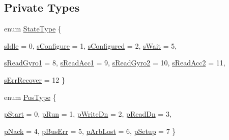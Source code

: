\subsection*{Private Types}
\begin{DoxyCompactItemize}
\item 
enum \hyperlink{class_i_m_u_a7b5e1bf1cf1407b3e4cf0dd2e18b523f}{StateType} \{ \par
\hyperlink{class_i_m_u_a7b5e1bf1cf1407b3e4cf0dd2e18b523fa82181a217d68f26cba06b38cfb94c1bc}{sIdle} =  0, 
\hyperlink{class_i_m_u_a7b5e1bf1cf1407b3e4cf0dd2e18b523fae3a15f0845da0f426c48b6bd9ed01b21}{sConfigure} =  1, 
\hyperlink{class_i_m_u_a7b5e1bf1cf1407b3e4cf0dd2e18b523fa98a87654cac5bbc7d12c9701563dbae5}{sConfigured} =  2, 
\hyperlink{class_i_m_u_a7b5e1bf1cf1407b3e4cf0dd2e18b523fa4d7c7afff1b740c59d740b9b77a8d18c}{sWait} =  5, 
\par
\hyperlink{class_i_m_u_a7b5e1bf1cf1407b3e4cf0dd2e18b523fa8f3b3efb815c4ee9396ccb1fda939f77}{sReadGyro1} =  8, 
\hyperlink{class_i_m_u_a7b5e1bf1cf1407b3e4cf0dd2e18b523fa7e6ba39651fb8aca4abcdf80ed789d8b}{sReadAcc1} =  9, 
\hyperlink{class_i_m_u_a7b5e1bf1cf1407b3e4cf0dd2e18b523fa2e538ebe471a9482d15ab162ec3bdc6d}{sReadGyro2} =  10, 
\hyperlink{class_i_m_u_a7b5e1bf1cf1407b3e4cf0dd2e18b523fa4d82e2432f2e2075cef6143740c4df59}{sReadAcc2} =  11, 
\par
\hyperlink{class_i_m_u_a7b5e1bf1cf1407b3e4cf0dd2e18b523fae27080f67607320b8cc57d8402a07277}{sErrRecover} =  12
 \}
\item 
enum \hyperlink{class_i_m_u_ad01128d82debc1e4213affe4858f3144}{PosType} \{ \par
\hyperlink{class_i_m_u_ad01128d82debc1e4213affe4858f3144a1d2d6c166c92bec6d19b37a6dbeeaf8c}{pStart} =  0, 
\hyperlink{class_i_m_u_ad01128d82debc1e4213affe4858f3144a9cb1b471b394a5a3a87c6bab61ae00e4}{pRun} =  1, 
\hyperlink{class_i_m_u_ad01128d82debc1e4213affe4858f3144ac2332a4383aa00818b3fc4ed83ec1f4d}{pWriteDn} =  2, 
\hyperlink{class_i_m_u_ad01128d82debc1e4213affe4858f3144a1b257baca1eb9eb3e7192a01770cce76}{pReadDn} =  3, 
\par
\hyperlink{class_i_m_u_ad01128d82debc1e4213affe4858f3144ac361e1f3b3b93592825ae06da0309c62}{pNack} =  4, 
\hyperlink{class_i_m_u_ad01128d82debc1e4213affe4858f3144a3db70da4b0066e7738bed5e25f4fc405}{pBusErr} =  5, 
\hyperlink{class_i_m_u_ad01128d82debc1e4213affe4858f3144a5b061676aa01e1049ff07e5a191c9af8}{pArbLost} =  6, 
\hyperlink{class_i_m_u_ad01128d82debc1e4213affe4858f3144a73419f05716e41c972241a4fc0c6ead0}{pSetup} =  7
 \}
\item 

\end{DoxyCompactItemize}

